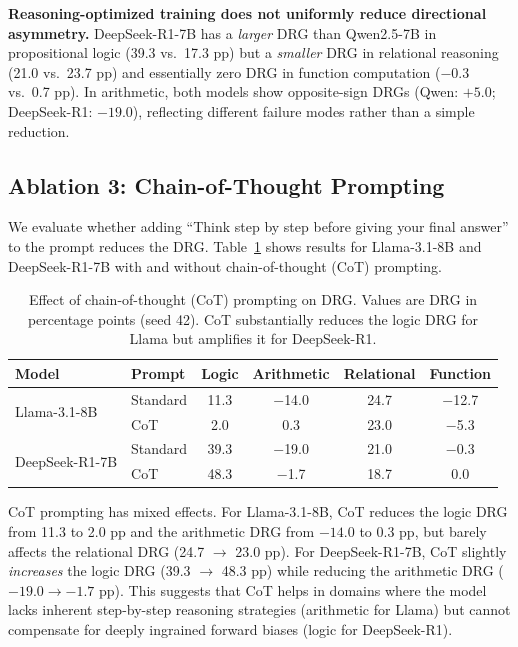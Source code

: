 \documentclass{article}
\begin{document}
\textbf{Reasoning-optimized training does not uniformly reduce directional asymmetry.} DeepSeek-R1-7B has a \emph{larger} DRG than Qwen2.5-7B in propositional logic (39.3 vs.\ 17.3 pp) but a \emph{smaller} DRG in relational reasoning (21.0 vs.\ 23.7 pp) and essentially zero DRG in function computation ($-0.3$ vs.\ 0.7 pp). In arithmetic, both models show opposite-sign DRGs (Qwen: $+5.0$; DeepSeek-R1: $-19.0$), reflecting different failure modes rather than a simple reduction.

\subsection{Ablation 3: Chain-of-Thought Prompting}
\label{sec:cot}

We evaluate whether adding ``Think step by step before giving your final answer'' to the prompt reduces the DRG. Table~\ref{tab:cot} shows results for Llama-3.1-8B and DeepSeek-R1-7B with and without chain-of-thought (CoT) prompting.

\begin{table}[t]
\caption{Effect of chain-of-thought (CoT) prompting on DRG. Values are DRG in percentage points (seed 42). CoT substantially reduces the logic DRG for Llama but amplifies it for DeepSeek-R1.}
\label{tab:cot}
\centering
\begin{tabular}{llcccc}
\toprule
Model & Prompt & Logic & Arithmetic & Relational & Function \\
\midrule
\multirow{2}{*}{Llama-3.1-8B} & Standard & 11.3 & $-$14.0 & 24.7 & $-$12.7 \\
& CoT & 2.0 & 0.3 & 23.0 & $-$5.3 \\
\midrule
\multirow{2}{*}{DeepSeek-R1-7B} & Standard & 39.3 & $-$19.0 & 21.0 & $-$0.3 \\
& CoT & 48.3 & $-$1.7 & 18.7 & 0.0 \\
\bottomrule
\end{tabular}
\end{table}

CoT prompting has mixed effects. For Llama-3.1-8B, CoT reduces the logic DRG from 11.3 to 2.0 pp and the arithmetic DRG from $-14.0$ to 0.3 pp, but barely affects the relational DRG (24.7 $\to$ 23.0 pp). For DeepSeek-R1-7B, CoT slightly \emph{increases} the logic DRG (39.3 $\to$ 48.3 pp) while reducing the arithmetic DRG ($-19.0 \to -1.7$ pp). This suggests that CoT helps in domains where the model lacks inherent step-by-step reasoning strategies (arithmetic for Llama) but cannot compensate for deeply ingrained forward biases (logic for DeepSeek-R1).
\end{document}
